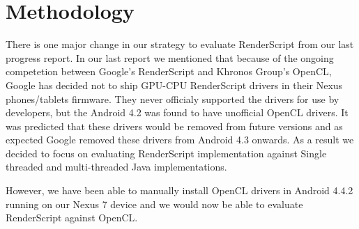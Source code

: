 \section*{Methodology}
There is one major change in our strategy to evaluate RenderScript from our last
progress report. In our last report we mentioned that because of the ongoing competetion between
Google's RenderScript and Khronos Group's OpenCL, Google has decided not to ship
GPU-CPU RenderScript drivers in their Nexus phones/tablets firmware. They never
officialy supported the drivers for use by developers, but the Android 4.2 was
found to have unofficial OpenCL drivers. It was predicted that these drivers
would be removed from future versions and as expected Google removed these drivers from
Android 4.3 onwards. As a result we decided to focus on evaluating RenderScript
implementation against Single threaded and multi-threaded Java implementations. 

However, we have been able to manually install OpenCL drivers in Android 4.4.2
running on our Nexus 7 device and we would now be able to evaluate
RenderScript against OpenCL.
